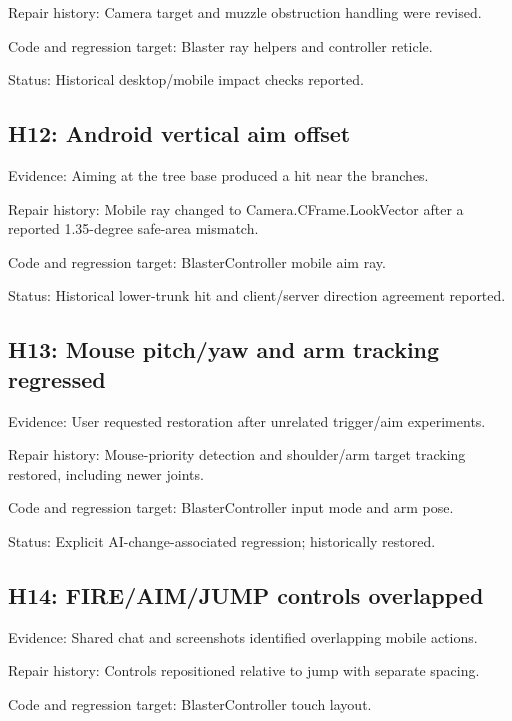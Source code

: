 Repair history: Camera target and muzzle obstruction handling were revised.\allowbreak{}

Code and regression target: Blaster ray helpers and controller reticle.\allowbreak{}

Status: Historical desktop/\allowbreak{}mobile impact checks reported.\allowbreak{}

\subsection{H12: Android vertical aim offset}
Evidence: Aiming at the tree base produced a hit near the branches.\allowbreak{}

Repair history: Mobile ray changed to Camera.\allowbreak{}CFrame.\allowbreak{}LookVector after a reported 1.\allowbreak{}35-degree safe-area mismatch.\allowbreak{}

Code and regression target: BlasterController mobile aim ray.\allowbreak{}

Status: Historical lower-trunk hit and client/\allowbreak{}server direction agreement reported.\allowbreak{}

\subsection{H13: Mouse pitch/\allowbreak{}yaw and arm tracking regressed}
Evidence: User requested restoration after unrelated trigger/\allowbreak{}aim experiments.\allowbreak{}

Repair history: Mouse-priority detection and shoulder/\allowbreak{}arm target tracking restored, including newer joints.\allowbreak{}

Code and regression target: BlasterController input mode and arm pose.\allowbreak{}

Status: Explicit AI-change-associated regression; historically restored.\allowbreak{}

\subsection{H14: FIRE/\allowbreak{}AIM/\allowbreak{}JUMP controls overlapped}
Evidence: Shared chat and screenshots identified overlapping mobile actions.\allowbreak{}

Repair history: Controls repositioned relative to jump with separate spacing.\allowbreak{}

Code and regression target: BlasterController touch layout.\allowbreak{}

